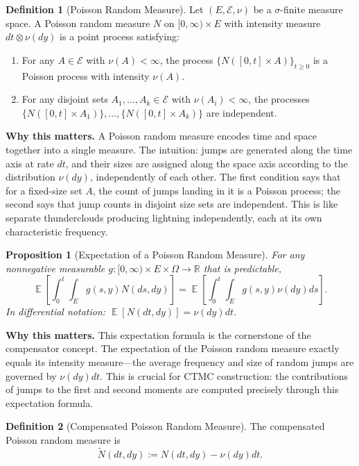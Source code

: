 \documentclass[11pt,a4paper,openany]{book}
\theoremstyle{definition}
\newtheorem{definition}{Definition}[chapter]
\theoremstyle{plain}
\newtheorem{proposition}[theorem]{Proposition}
\theoremstyle{remark}
\DeclareMathOperator{\E}{\mathbb{E}}
\newcommand{\1}{\mathbbm{1}}
\newcommand{\R}{\mathbb{R}}
\newcommand{\calE}{\mathcal{E}}
\begin{document}
\begin{definition}[Poisson Random Measure]
Let $(E, \calE, \nu)$ be a $\sigma$-finite measure space. A Poisson random measure $N$ on $[0, \infty) \times E$ with intensity measure $dt \otimes \nu(dy)$ is a point process satisfying:
\begin{enumerate}[label=(\arabic*)]
    \item For any $A \in \calE$ with $\nu(A) < \infty$, the process $\{N([0,t] \times A)\}_{t \geq 0}$ is a Poisson process with intensity $\nu(A)$.
    \item For any disjoint sets $A_{1}, \ldots, A_{k} \in \calE$ with $\nu(A_{i}) < \infty$, the processes $\{N([0,t] \times A_{1})\}, \ldots, \{N([0,t] \times A_{k})\}$ are independent.
\end{enumerate}
\end{definition}

\medskip
\noindent\textbf{Why this matters.} A Poisson random measure encodes time and space together into a single measure. The intuition: jumps are generated along the time axis at rate $dt$, and their sizes are assigned along the space axis according to the distribution $\nu(dy)$, independently of each other. The first condition says that for a fixed-size set $A$, the count of jumps landing in it is a Poisson process; the second says that jump counts in disjoint size sets are independent. This is like separate thunderclouds producing lightning independently, each at its own characteristic frequency.

\begin{proposition}[Expectation of a Poisson Random Measure]
For any nonnegative measurable $g: [0,\infty) \times E \times \Omega \to \R$ that is predictable,
\[
\E\left[\int_{0}^{t} \int_{E} g(s, y) N(ds, dy)\right] = \E\left[\int_{0}^{t} \int_{E} g(s, y) \nu(dy) ds\right].
\]
In differential notation: $\E[N(dt, dy)] = \nu(dy) dt$.
\end{proposition}

\medskip
\noindent\textbf{Why this matters.} This expectation formula is the cornerstone of the compensator concept. The expectation of the Poisson random measure exactly equals its intensity measure---the average frequency and size of random jumps are governed by $\nu(dy)dt$. This is crucial for CTMC construction: the contributions of jumps to the first and second moments are computed precisely through this expectation formula.

\begin{definition}[Compensated Poisson Random Measure]
The compensated Poisson random measure is
\[
\widetilde{N}(dt, dy) := N(dt, dy) - \nu(dy) dt.
\]
\end{definition}
\end{document}
